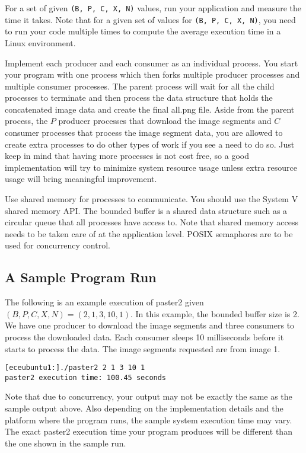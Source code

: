 For a set of given \verb+(B, P, C, X, N)+ values, run your application and measure the time it takes. Note that for a given set of values for \verb+(B, P, C, X, N)+, you need to run your code multiple times to compute the average execution time in a Linux environment.

Implement each producer and each consumer as an individual process. You start your program with one process which then forks multiple producer processes and multiple consumer processes. The parent process will wait for all the child processes to terminate and then process the data structure that holds the concatenated image data and create the final all.png file. Aside from the parent process, the $P$ producer processes that download the image segments and $C$ consumer processes that process the image segment data, you are allowed to create extra processes to do other types of work if you see a need to do so. Just keep in mind that having more processes is not cost free, so a good implementation will try to minimize system resource usage unless extra resource usage will bring meaningful improvement.


Use shared memory for processes to communicate. You should use the System V %
shared memory API. The bounded buffer is a shared data structure such as a circular queue that all processes have access to. Note that shared memory access needs to be taken care of at the application level. POSIX semaphores are to be used for concurrency control.

\subsection*{A Sample Program Run}
The following is an example execution of paster2 given $(B, P, C, X, N) = (2, 1, 3, 10, 1)$. In this example, the bounded buffer size is 2. We have one producer to download the image segments and three  consumers to process the downloaded data. Each consumer sleeps 10 milliseconds before it starts to process the data. The image segments requested are from image 1.
\begin{verbatim}
[eceubuntu1:]./paster2 2 1 3 10 1
paster2 execution time: 100.45 seconds
\end{verbatim}
Note that due to concurrency, your output may not be exactly the same as the sample output above. Also depending on the implementation details and the platform where the program runs, the sample system execution time may vary. The exact paster2 execution time your program produces will be different than the one shown in the sample run.

